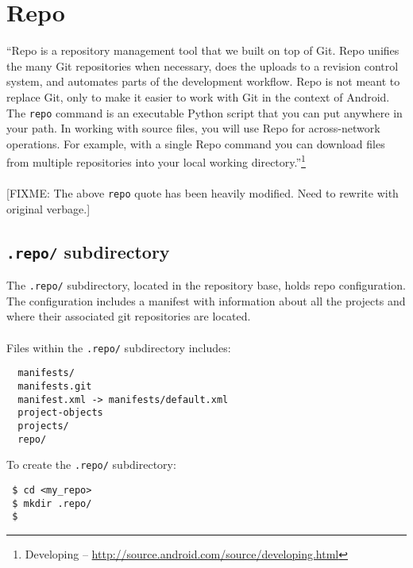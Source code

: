 \documentclass[12pt,letterpaper,dvips]{article}
\newcommand{\FIXME}[1]{\textsf{[FIXME: #1]}}
\newcommand{\cmd}[1]{\texttt{#1}}
\begin{document}
\newpage
\section{Repo}
``Repo is a repository management tool that we built on top of Git.
Repo unifies the many Git repositories when necessary, does the
uploads to a revision control system, and automates parts of the
development workflow.  Repo is not meant to replace Git, only to
make it easier to work with Git in the context of Android.  The
\cmd{repo} command is an executable Python script that you can put
anywhere in your path.  In working with source files, you will use
Repo for across-network operations.  For example, with a single
Repo command you can download files from multiple repositories
into your local working directory.''\footnote{Developing -- \href{http://source.android.com/source/developing.html}{http://source.android.com/source/developing.html}}
\\
\\
\noindent \FIXME{The above \cmd{repo} quote has been heavily modified.
Need to rewrite with original verbage.}


\subsection{\cmd{.repo/} subdirectory}
The \cmd{.repo/} subdirectory, located in the repository base,
holds repo configuration.  The configuration includes a manifest
with information about all the projects and where their associated git
repositories are located.
\\
\\
Files within the \cmd{.repo/} subdirectory includes:
\begin{verbatim}
  manifests/
  manifests.git
  manifest.xml -> manifests/default.xml
  project-objects
  projects/
  repo/
\end{verbatim}
 
\noindent To create the \cmd{.repo/} subdirectory:

\begin{Verbatim}
 $ cd <my_repo>
 $ mkdir .repo/
 $ 
\end{Verbatim}
\end{document}
